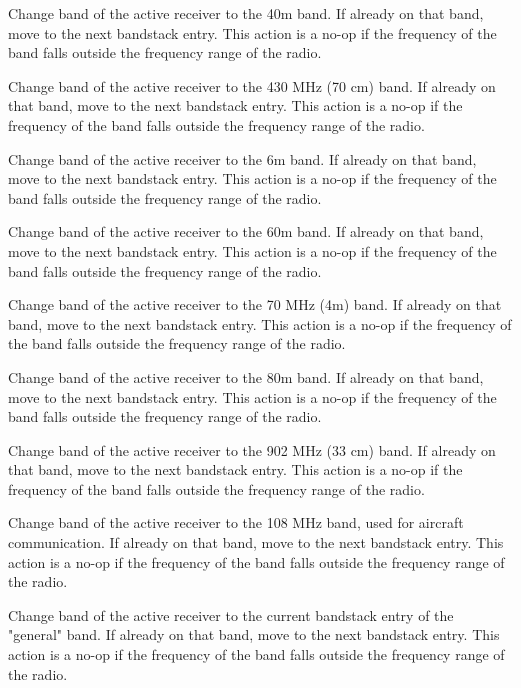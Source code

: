 \documentclass[12pt]{book}
\begin{document}
{Change band of the active receiver to the 40m band. If already on that band, move to
the next bandstack entry. This action is a no-op if the frequency of the band falls outside the frequency range
of the radio.}

{Change band of the active receiver to the 430 MHz (70 cm) band. If already on that band, move to
the next bandstack entry. This action is a no-op if the frequency of the band falls outside the frequency range
of the radio.}

{Change band of the active receiver to the 6m band. If already on that band, move to
the next bandstack entry. This action is a no-op if the frequency of the band falls outside the frequency range
of the radio.}

{Change band of the active receiver to the 60m band. If already on that band, move to
the next bandstack entry. This action is a no-op if the frequency of the band falls outside the frequency range
of the radio.}

{Change band of the active receiver to the 70 MHz (4m)  band. If already on that band, move to
the next bandstack entry. This action is a no-op if the frequency of the band falls outside the frequency range
of the radio.}

{Change band of the active receiver to the 80m band. If already on that band, move to
the next bandstack entry. This action is a no-op if the frequency of the band falls outside the frequency range
of the radio.}

{Change band of the active receiver to the 902 MHz (33 cm) band. If already on that band, move to
the next bandstack entry. This action is a no-op if the frequency of the band falls outside the frequency range
of the radio.}

{Change band of the active receiver to the 108 MHz band, used for aircraft communication. If already on that band, move to
the next bandstack entry. This action is a no-op if the frequency of the band falls outside the frequency range
of the radio.} 

{Change band of the active receiver to the current bandstack entry of the "general" band. If already on that band, move to
the next bandstack entry. This action is a no-op if the frequency of the band falls outside the frequency range
of the radio.}
\end{document}
